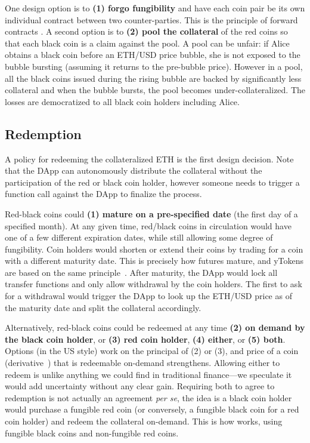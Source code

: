 One design option is to \textbf{(1) forgo fungibility} and have each coin pair be its own individual contract between two counter-parties. This is the principle of forward contracts \cite{Har03}. A second option is to \textbf{(2) pool the collateral} of the red coins so that each black coin is a claim against the pool. A pool can be unfair: if Alice obtains a black coin before an ETH/USD price bubble, she is not exposed to the bubble bursting (assuming it returns to the pre-bubble price). However in a pool, all the black coins issued during the rising bubble are backed by significantly less collateral and when the bubble bursts, the pool becomes under-collateralized. The losses are democratized to all black coin holders including Alice. 


\subsection{Redemption}
\label{sec:maturity}

A policy for redeeming the collateralized ETH is the first design decision. Note that the DApp can autonomously distribute the collateral without the participation of the red or black coin holder, however someone needs to trigger a function call against the DApp to finalize the process.

 Red-black coins could \textbf{(1) mature on a pre-specified date} (\eg the first day of a specified month). At any given time, red/black coins in circulation would have one of a few different expiration dates, while still allowing some degree of fungibility. Coin holders would shorten or extend their coins by trading for a coin with a different maturity date. This is precisely how futures \cite{Har03} mature, and yTokens are based on the same principle~\cite{RoNi20}. After maturity, the DApp would lock all transfer functions and only allow withdrawal by the coin holders. The first to ask for a withdrawal would trigger the DApp to look up the ETH/USD price as of the maturity date and split the collateral accordingly. 

Alternatively, red-black coins could be redeemed at any time \textbf{(2) on demand by the black coin holder}, or \textbf{(3) red coin holder}, \textbf{(4) either}, or \textbf{(5) both}. Options (in the US style) \cite{Har03} work on the principal of (2) or (3), and price of a coin (\cf derivative~\cite{Sey09}) that is redeemable on-demand strengthens. Allowing either to redeem is unlike anything we could find in traditional finance---we speculate it would add uncertainty without any clear gain. Requiring both to agree to redemption is not actually an agreement \textit{per se}, the idea is a black coin holder would purchase a fungible red coin (or conversely, a fungible black coin for a red coin holder) and redeem the collateral on-demand. This is how \dai works, using fungible black coins and non-fungible red coins. 

